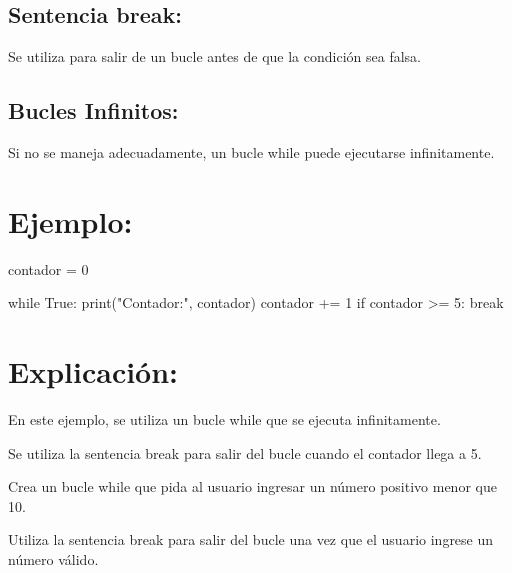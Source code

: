 \documentclass[
  a4paper,
  DIV=11,
  numbers=noendperiod,
  onepage,
  openany]{scrreprt}
\newenvironment{Shaded}{\begin{snugshade}}{\end{snugshade}}
\newcommand{\BuiltInTok}[1]{\textcolor[rgb]{0.00,0.23,0.31}{#1}}
\newcommand{\ControlFlowTok}[1]{\textcolor[rgb]{0.00,0.23,0.31}{#1}}
\newcommand{\DecValTok}[1]{\textcolor[rgb]{0.68,0.00,0.00}{#1}}
\newcommand{\NormalTok}[1]{\textcolor[rgb]{0.00,0.23,0.31}{#1}}
\newcommand{\OperatorTok}[1]{\textcolor[rgb]{0.37,0.37,0.37}{#1}}
\newcommand{\StringTok}[1]{\textcolor[rgb]{0.13,0.47,0.30}{#1}}
\newcommand{\VariableTok}[1]{\textcolor[rgb]{0.07,0.07,0.07}{#1}}
\begin{document}
\hypertarget{sentencia-break-1}{%
\subsection{Sentencia break:}\label{sentencia-break-1}}

Se utiliza para salir de un bucle antes de que la condición sea falsa.

\hypertarget{bucles-infinitos-1}{%
\subsection{Bucles Infinitos:}\label{bucles-infinitos-1}}

Si no se maneja adecuadamente, un bucle while puede ejecutarse
infinitamente.

\hypertarget{ejemplo-39}{%
\section{Ejemplo:}\label{ejemplo-39}}

\begin{Shaded}
\begin{Highlighting}[]
\NormalTok{contador }\OperatorTok{=} \DecValTok{0}

\ControlFlowTok{while} \VariableTok{True}\NormalTok{:}
    \BuiltInTok{print}\NormalTok{(}\StringTok{"Contador:"}\NormalTok{, contador)}
\NormalTok{    contador }\OperatorTok{+=} \DecValTok{1}
    \ControlFlowTok{if}\NormalTok{ contador }\OperatorTok{\textgreater{}=} \DecValTok{5}\NormalTok{:}
        \ControlFlowTok{break}
\end{Highlighting}
\end{Shaded}

\hypertarget{explicaciuxf3n-39}{%
\section{Explicación:}\label{explicaciuxf3n-39}}

En este ejemplo, se utiliza un bucle while que se ejecuta infinitamente.

Se utiliza la sentencia break para salir del bucle cuando el contador
llega a 5.

\begin{tcolorbox}[enhanced jigsaw, colbacktitle=quarto-callout-important-color!10!white, toprule=.15mm, leftrule=.75mm, titlerule=0mm, opacityback=0, rightrule=.15mm, opacitybacktitle=0.6, breakable, left=2mm, coltitle=black, title=\textcolor{quarto-callout-important-color}{\faExclamation}\hspace{0.5em}{Actividad Práctica:}, toptitle=1mm, bottomtitle=1mm, arc=.35mm, bottomrule=.15mm, colback=white, colframe=quarto-callout-important-color-frame]

Crea un bucle while que pida al usuario ingresar un número positivo
menor que 10.

Utiliza la sentencia break para salir del bucle una vez que el usuario
ingrese un número válido.

\end{tcolorbox}
\end{document}
